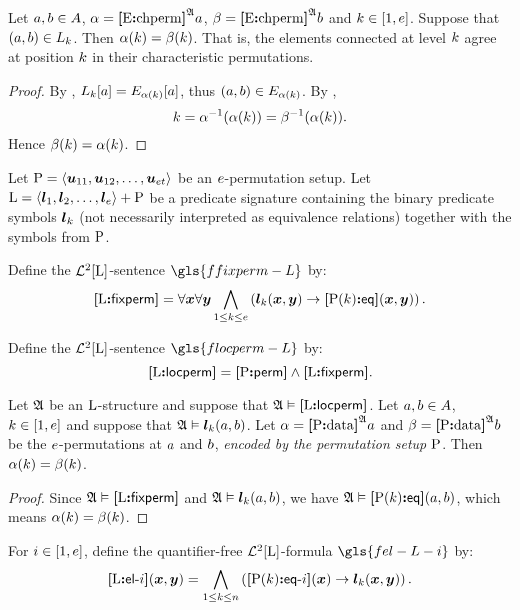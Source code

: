 \begin{remark}\label{rem:local-lvl-agree}
Let $a, b \in A$, $\alpha = {\bm{[}{\mathrm{E}}\mathord{\bm{:}}\mathrm{chperm}\bm{]}}^{\mathfrak{A}}a$,
$\beta = {\bm{[}{\mathrm{E}}\mathord{\bm{:}}\mathrm{chperm}\bm{]}}^{\mathfrak{A}}b$ and $k \in [1,e]$.
Suppose that $(a, b) \in L_{k}$.
Then $\alpha(k) = \beta(k)$.
That is, the elements connected at level $k$ agree at position $k$ in their
characteristic permutations.
\end{remark}
\begin{proof}
By , $L_{k}[a] = E_{\alpha(k)}[a]$, thus
$(a, b) \in E_{\alpha(k)}$. 
By ,
\[
  k = \alpha^{-1}(\alpha(k)) = \beta^{-1}(\alpha(k)).
\]
Hence $\beta(k) = \alpha(k)$.
\end{proof}

Let ${\mathrm{P}} = \left\langle \bm{u}_{11}, \bm{u}_{12}, \dots, \bm{u}_{et} \right\rangle$ be an
$e$-permutation setup.
Let ${\mathrm{L}} = \left\langle \bm{l}_{1}, \bm{l}_{2}, \dots, \bm{l}_{e} \right\rangle + {\mathrm{P}}$ be a predicate
signature containing the binary predicate symbols $\bm{l}_{k}$ (not necessarily
interpreted as equivalence relations) together with the symbols from ${\mathrm{P}}$.
\begin{definition}
Define the $\mathcal{L}^{2}[{\mathrm{L}}]$-sentence $\gls{ffixperm-L}$ by:
\[
  {\bm{[}{\mathrm{L}}\mathord{\bm{:}}\mathsf{fixperm}\bm{]}} = \forall\bm{x} \forall\bm{y} \bigwedge_{1 \leq k \leq e}
  \left(\bm{l}_{k}(\bm{x},\bm{y}) \rightarrow {\bm{[}{\mathrm{P}}(k)\mathord{\bm{:}}\mathsf{eq}\bm{]}}(\bm{x},\bm{y})\right).
\]
\end{definition}
\begin{definition}
Define the $\mathcal{L}^{2}[{\mathrm{L}}]$-sentence $\gls{flocperm-L}$ by:
\[
  {\bm{[}{\mathrm{L}}\mathord{\bm{:}}\mathsf{locperm}\bm{]}} = {\bm{[}{\mathrm{P}}\mathord{\bm{:}}\mathsf{perm}\bm{]}} \land {\bm{[}{\mathrm{L}}\mathord{\bm{:}}\mathsf{fixperm}\bm{]}}.
\]
\end{definition}
\begin{remark}\label{rem:local-perm-val-fixed}
Let $\mathfrak{A}$ be an ${\mathrm{L}}$-structure and suppose that $\mathfrak{A} \vDash {\bm{[}{\mathrm{L}}\mathord{\bm{:}}\mathsf{locperm}\bm{]}}$.
Let $a, b \in A$, $k \in [1,e]$ and suppose that
$\mathfrak{A} \vDash \bm{l}_{k}(a, b)$.
Let $\alpha = {\bm{[}{\mathrm{P}}\mathord{\bm{:}}\mathrm{data}\bm{]}}^{\mathfrak{A}}a$ and $\beta = {\bm{[}{\mathrm{P}}\mathord{\bm{:}}\mathrm{data}\bm{]}}^{\mathfrak{A}}b$ be the
$e$-permutations at $a$ and $b$,
\emph{encoded by the permutation setup ${\mathrm{P}}$}.
Then $\alpha(k) = \beta(k)$.
\end{remark}
\begin{proof}
Since $\mathfrak{A} \vDash {\bm{[}{\mathrm{L}}\mathord{\bm{:}}\mathsf{fixperm}\bm{]}}$ and $\mathfrak{A} \vDash \bm{l}_{k}(a,b)$, we have
$\mathfrak{A} \vDash {\bm{[}{\mathrm{P}}(k)\mathord{\bm{:}}\mathsf{eq}\bm{]}}(a,b)$, which means $\alpha(k) =
\beta(k)$.
\end{proof}

\begin{definition}
For $i \in [1,e]$, define the quantifier-free $\mathcal{L}^{2}[{\mathrm{L}}]$-formula
$\gls{fel-L-i}$ by:
\[
  {\bm{[}{\mathrm{L}}\mathord{\bm{:}}\mathsf{el}{\hbox{-}}i\bm{]}}(\bm{x},\bm{y}) = \bigwedge_{1 \leq k \leq n}
  \left({\bm{[}{\mathrm{P}}(k)\mathord{\bm{:}}\mathsf{eq}{\hbox{-}}i\bm{]}}(\bm{x}) \rightarrow \bm{l}_{k}(\bm{x},\bm{y})\right).
\]
\end{definition}

